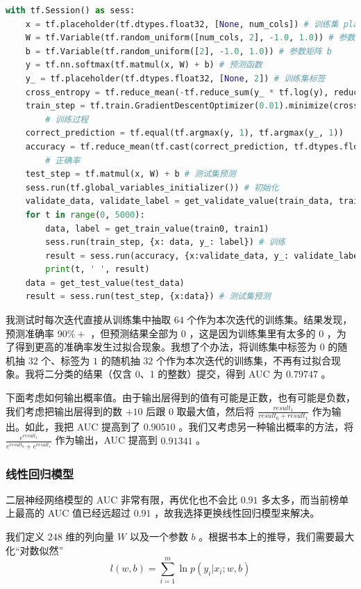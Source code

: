 \documentclass{article}
\begin{document}
\begin{lstlisting}[language=python]
with tf.Session() as sess:
	x = tf.placeholder(tf.dtypes.float32, [None, num_cols]) # 训练集 placeholder
	W = tf.Variable(tf.random_uniform([num_cols, 2], -1.0, 1.0)) # 参数矩阵 W
	b = tf.Variable(tf.random_uniform([2], -1.0, 1.0)) # 参数矩阵 b
	y = tf.nn.softmax(tf.matmul(x, W) + b) # 预测函数
	y_ = tf.placeholder(tf.dtypes.float32, [None, 2]) # 训练集标签
	cross_entropy = tf.reduce_mean(-tf.reduce_sum(y_ * tf.log(y), reduction_indices=[1])) # 交叉熵
	train_step = tf.train.GradientDescentOptimizer(0.01).minimize(cross_entropy)
		# 训练过程
	correct_prediction = tf.equal(tf.argmax(y, 1), tf.argmax(y_, 1))
	accuracy = tf.reduce_mean(tf.cast(correct_prediction, tf.dtypes.float32))
		# 正确率
	test_step = tf.matmul(x, W) + b # 测试集预测
	sess.run(tf.global_variables_initializer()) # 初始化
	validate_data, validate_label = get_validate_value(train_data, train_label, train_num, num_rows) # 验证集
	for t in range(0, 5000):
		data, label = get_train_value(train0, train1)
		sess.run(train_step, {x: data, y_: label}) # 训练
		result = sess.run(accuracy, {x:validate_data, y_: validate_label}) # 计算准确率
		print(t, ' ', result)
	data = get_test_value(test_data)
	result = sess.run(test_step, {x:data}) # 测试集预测
\end{lstlisting}

我测试时每次迭代直接从训练集中抽取 $64$ 个作为本次迭代的训练集。结果发现，预测准确率 $90\%+$ ，但预测结果全部为 $0$ ，这是因为训练集里有太多的 $0$ ，为了得到更高的准确率发生过拟合现象。我想了个办法，将训练集中标签为 $0$ 的随机抽 $32$ 个、标签为 $1$ 的随机抽 $32$ 个作为本次迭代的训练集，不再有过拟合现象。我将二分类的结果（仅含 0、1 的整数）提交，得到 AUC 为 $0.79747$ 。

下面考虑如何输出概率值。由于输出层得到的值有可能是正数，也有可能是负数，我们考虑把输出层得到的数 $+10$ 后跟 $0$ 取最大值，然后将 $\frac{result_1}{result_0 + result_1}$ 作为输出。如此，我把 AUC 提高到了 $0.90510$ 。我们又考虑另一种输出概率的方法，将 $\frac{e^{result_1}}{e^{result_0} + e^{result_1}}$ 作为输出，AUC 提高到 $0.91341$ 。

\subsubsection{线性回归模型}

二层神经网络模型的 AUC 非常有限，再优化也不会比 $0.91$ 多太多，而当前榜单上最高的 AUC 值已经远超过 $0.91$ ，故我选择更换线性回归模型来解决。

我们定义 $248$ 维的列向量 $W$ 以及一个参数 $b$ 。根据书本上的推导，我们需要最大化“对数似然” $$l(w, b) = \sum\limits_{i=1}^{m} \ln p(y_i | x_i; w, b)$$
\end{document}
